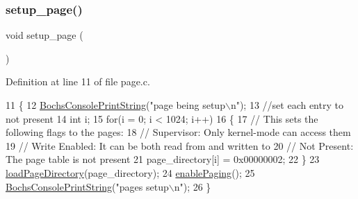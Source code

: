 \subsubsection{\texorpdfstring{setup\+\_\+page()}{setup\_page()}}
{\footnotesize\ttfamily void setup\+\_\+page (\begin{DoxyParamCaption}{ }\end{DoxyParamCaption})}



Definition at line 11 of file page.\+c.


\begin{DoxyCode}
11                   \{
12     \hyperlink{a00017_a19e1f554d03c977f8b947f21489daa41_a19e1f554d03c977f8b947f21489daa41}{BochsConsolePrintString}(\textcolor{stringliteral}{"page being setup\(\backslash\)n"});
13     \textcolor{comment}{//set each entry to not present}
14     \textcolor{keywordtype}{int} i;
15     \textcolor{keywordflow}{for}(i = 0; i < 1024; i++)
16     \{
17         \textcolor{comment}{// This sets the following flags to the pages:}
18         \textcolor{comment}{//   Supervisor: Only kernel-mode can access them}
19         \textcolor{comment}{//   Write Enabled: It can be both read from and written to}
20         \textcolor{comment}{//   Not Present: The page table is not present}
21         page\_directory[i] = 0x00000002;
22     \}
23     \hyperlink{a00047_abfdf37b9c42cafa83b39f1a41264989c_abfdf37b9c42cafa83b39f1a41264989c}{loadPageDirectory}(page\_directory);
24     \hyperlink{a00047_a8fe3a9cca4b2ccd7a2743e9943880a32_a8fe3a9cca4b2ccd7a2743e9943880a32}{enablePaging}();
25     \hyperlink{a00017_a19e1f554d03c977f8b947f21489daa41_a19e1f554d03c977f8b947f21489daa41}{BochsConsolePrintString}(\textcolor{stringliteral}{"pages setup\(\backslash\)n"});
26 \}
\end{DoxyCode}
